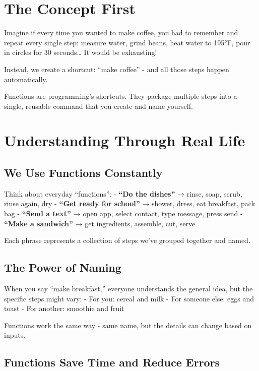 \documentclass[
  letterpaper,
  DIV=11,
  numbers=noendperiod,
  oneside]{scrreprt}
\begin{document}
\section{The Concept First}\label{the-concept-first-5}

Imagine if every time you wanted to make coffee, you had to remember and
repeat every single step: measure water, grind beans, heat water to
195°F, pour in circles for 30 seconds\ldots{} It would be exhausting!

Instead, we create a shortcut: ``make coffee'' - and all those steps
happen automatically.

Functions are programming's shortcuts. They package multiple steps into
a single, reusable command that you create and name yourself.

\section{Understanding Through Real
Life}\label{understanding-through-real-life-5}

\subsection{We Use Functions
Constantly}\label{we-use-functions-constantly}

Think about everyday ``functions'': - \textbf{``Do the dishes''} →
rinse, soap, scrub, rinse again, dry - \textbf{``Get ready for school''}
→ shower, dress, eat breakfast, pack bag - \textbf{``Send a text''} →
open app, select contact, type message, press send - \textbf{``Make a
sandwich''} → get ingredients, assemble, cut, serve

Each phrase represents a collection of steps we've grouped together and
named.

\subsection{The Power of Naming}\label{the-power-of-naming}

When you say ``make breakfast,'' everyone understands the general idea,
but the specific steps might vary: - For you: cereal and milk - For
someone else: eggs and toast - For another: smoothie and fruit

Functions work the same way - same name, but the details can change
based on inputs.

\subsection{Functions Save Time and Reduce
Errors}\label{functions-save-time-and-reduce-errors}
\end{document}
